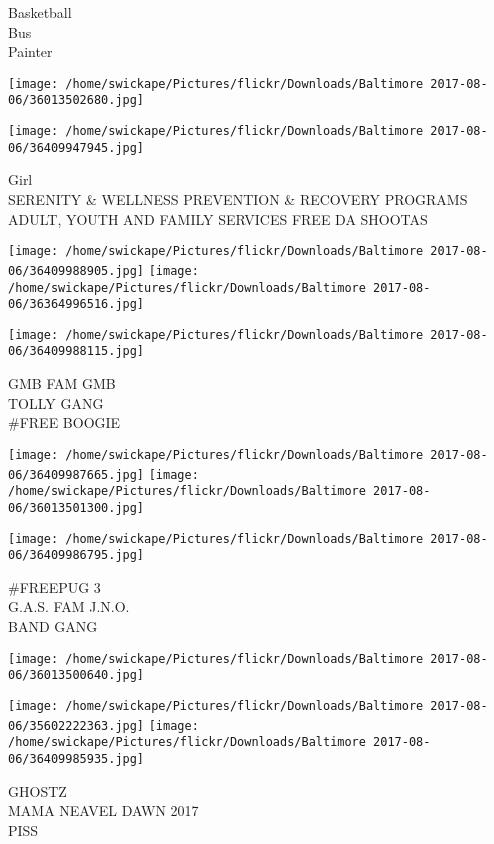 \documentclass[10pt,letterpaper]{article}
\begin{document}
Basketball\\
Bus\\
Painter
\pagebreak

\texttt{[image: /home/swickape/Pictures/flickr/Downloads/Baltimore 2017-08-06/36013502680.jpg]}

\vspace{0.25in}
\texttt{[image: /home/swickape/Pictures/flickr/Downloads/Baltimore 2017-08-06/36409947945.jpg]}

Girl\\
SERENITY \& WELLNESS PREVENTION \& RECOVERY PROGRAMS ADULT, YOUTH AND FAMILY SERVICES FREE DA SHOOTAS
\pagebreak

\texttt{[image: /home/swickape/Pictures/flickr/Downloads/Baltimore 2017-08-06/36409988905.jpg]}
\texttt{[image: /home/swickape/Pictures/flickr/Downloads/Baltimore 2017-08-06/36364996516.jpg]}

\vspace{0.25in}
\texttt{[image: /home/swickape/Pictures/flickr/Downloads/Baltimore 2017-08-06/36409988115.jpg]}

GMB FAM GMB\\
TOLLY GANG\\
\#FREE BOOGIE
\pagebreak

\texttt{[image: /home/swickape/Pictures/flickr/Downloads/Baltimore 2017-08-06/36409987665.jpg]}
\texttt{[image: /home/swickape/Pictures/flickr/Downloads/Baltimore 2017-08-06/36013501300.jpg]}

\texttt{[image: /home/swickape/Pictures/flickr/Downloads/Baltimore 2017-08-06/36409986795.jpg]}

\#FREEPUG 3\\
G.A.S. FAM J.N.O.\\
BAND GANG
\pagebreak

\texttt{[image: /home/swickape/Pictures/flickr/Downloads/Baltimore 2017-08-06/36013500640.jpg]}

\vspace{0.25in}
\texttt{[image: /home/swickape/Pictures/flickr/Downloads/Baltimore 2017-08-06/35602222363.jpg]}
\texttt{[image: /home/swickape/Pictures/flickr/Downloads/Baltimore 2017-08-06/36409985935.jpg]}

GHOSTZ\\
MAMA NEAVEL DAWN 2017\\
PISS
\pagebreak
\end{document}
